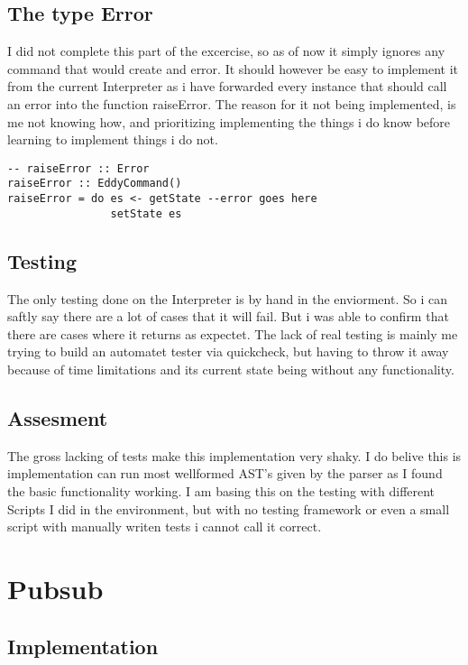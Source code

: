\documentclass{article}
\begin{document}
\subsection{The type Error}

I did not complete this part of the excercise, so as of now it simply
ignores any command that would create and error. It should however
be easy to implement it from the current Interpreter as i have
forwarded every instance that should call an error into the function
raiseError. The reason for it not being implemented, is me not knowing
how, and prioritizing implementing the things i do know before learning
to implement things i do not.
\begin{verbatim}
-- raiseError :: Error
raiseError :: EddyCommand() 
raiseError = do es <- getState --error goes here 
                setState es
\end{verbatim}

\subsection{Testing}

The only testing done on the Interpreter is by hand in the enviorment.
So i can saftly say there are a lot of cases that it will fail. But 
i was able to confirm that there are cases where it returns as expectet.
The lack of real testing is mainly me trying to build an automatet tester
via quickcheck,
but having to throw it away because of time limitations and its current 
state being without any functionality.

\subsection{Assesment}

The gross lacking of tests make this implementation very shaky.
I do belive this is implementation can run most wellformed AST's
given by the parser as I found the basic functionality working. 
I am basing this on the testing with different Scripts I did in
the environment, but with no testing framework or even a small
script with manually writen tests i cannot call it correct.

\section{Pubsub}

\subsection{Implementation}
\end{document}
